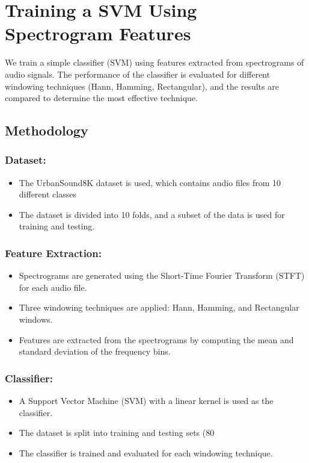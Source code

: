 \documentclass[a4paper,12pt]{article}
\begin{document}
\section{Training a SVM Using Spectrogram Features}
We train a simple classifier (SVM) using features extracted from spectrograms of audio signals. The performance of the classifier is evaluated for different windowing techniques (Hann, Hamming, Rectangular), and the results are compared to determine the most effective technique.
    \subsection{Methodology}
        \subsubsection{Dataset:}
            \begin{itemize}
                \item The UrbanSound8K dataset is used, which contains audio files from 10 different classes 
                \item The dataset is divided into 10 folds, and a subset of the data is used for training and testing.
            \end{itemize}
        \subsubsection{Feature Extraction:}
            \begin{itemize}
                \item Spectrograms are generated using the Short-Time Fourier Transform (STFT) for each audio file.
                \item Three windowing techniques are applied: Hann, Hamming, and Rectangular windows.
                \item Features are extracted from the spectrograms by computing the mean and standard deviation of the frequency bins.
            \end{itemize}
        \subsubsection{Classifier:}
            \begin{itemize}
                \item A Support Vector Machine (SVM) with a linear kernel is used as the classifier.
                \item The dataset is split into training and testing sets (80%
                \item The classifier is trained and evaluated for each windowing technique.
            \end{itemize}
\end{document}

